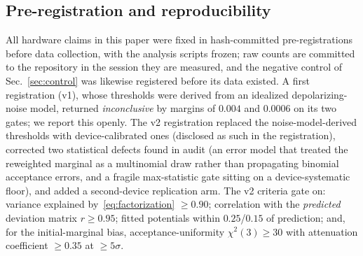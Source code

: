 \documentclass[aps,pra,twocolumn,superscriptaddress,nofootinbib]{revtex4-2}
\begin{document}
\subsection{Pre-registration and reproducibility}
All hardware claims in this paper were fixed in hash-committed pre-registrations before data collection, with the analysis scripts frozen; raw counts are committed to the repository in the session they are measured, and the negative control of Sec.~\ref{sec:control} was likewise registered before its data existed. A first registration (v1), whose thresholds were derived from an idealized depolarizing-noise model, returned \emph{inconclusive} by margins of $0.004$ and $0.0006$ on its two gates; we report this openly. The v2 registration replaced the noise-model-derived thresholds with device-calibrated ones (disclosed as such in the registration), corrected two statistical defects found in audit (an error model that treated the reweighted marginal as a multinomial draw rather than propagating binomial acceptance errors, and a fragile max-statistic gate sitting on a device-systematic floor), and added a second-device replication arm. The v2 criteria gate on: variance explained by~\eqref{eq:factorization} $\geq0.90$; correlation with the \emph{predicted} deviation matrix $r\geq0.95$; fitted potentials within $0.25$/$0.15$ of prediction; and, for the initial-marginal bias, acceptance-uniformity $\chi^2(3)\geq30$ with attenuation coefficient $\geq0.35$ at $\geq5\sigma$.
\end{document}
